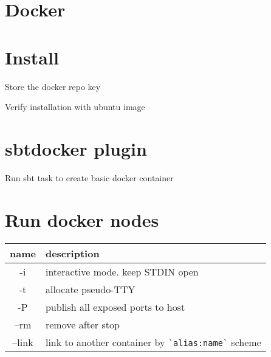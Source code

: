 \section{Docker}

\section{Install}
Store the docker repo key

Verify installation with ubuntu image

\section{sbt\-docker plugin}

Run sbt task to create basic docker container

\section{Run docker nodes}

\begin{tabular}{|c|l|}
\hline
name & description\\ \hline
-i & interactive mode. keep STDIN open\\
-t & allocate pseudo-TTY\\
-P & publish all exposed ports to host\\
--rm & remove after stop\\
--link & link to another container by \lstinline|`alias:name`| scheme\\
\hline
\end{tabular}
